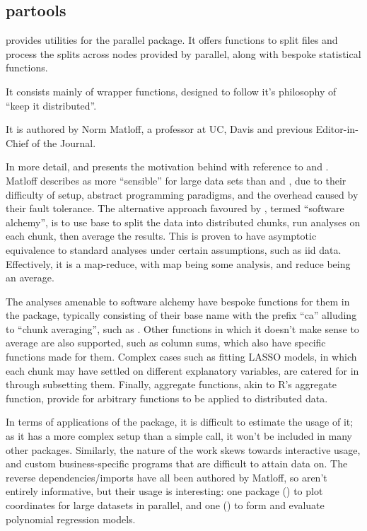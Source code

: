 \subsection{partools}\label{subsec:partools}

 provides utilities for the parallel
package\cite{matloff16softw_alchemy}. It offers functions to split
files and process the splits across nodes provided by parallel, along
with bespoke statistical functions.

It consists mainly of wrapper functions, designed to follow it's
philosophy of ``keep it distributed''.

It is authored by Norm Matloff, a professor at UC, Davis and previous
Editor-in-Chief of the \R Journal.

In more detail, \textcite{matloff15} and \textcite{matloff17} presents the
motivation behind  with reference to  and . Matloff
describes  as more ``sensible'' for large data sets than 
and , due to their difficulty of setup, abstract programming
paradigms, and the overhead caused by their fault tolerance. The
alternative approach favoured by , termed ``software alchemy'',
is to use base \R to split the data into distributed chunks, run analyses
on each chunk, then average the results. This is proven to have
asymptotic equivalence to standard analyses under certain assumptions,
such as iid data. Effectively, it is a map-reduce, with map being some
analysis, and reduce being an average.

The analyses amenable to software alchemy have bespoke functions for
them in the package, typically consisting of their base \R name with the
prefix ``ca'' alluding to ``chunk averaging'', such as
. Other functions in which it
doesn't make sense to average are also supported, such as column sums,
which also have specific functions made for them. Complex cases such as
fitting LASSO models, in which each chunk may have settled on different
explanatory variables, are catered for in  through subsetting
them. Finally, aggregate functions, akin to R's aggregate function,
provide for arbitrary functions to be applied to distributed data.

In terms of applications of the package, it is difficult to estimate the
usage of it; as it has a more complex setup than a simple
 call, it won't be included in many other packages.
Similarly, the nature of the work skews towards interactive usage, and
custom business-specific programs that are difficult to attain data on.
The reverse dependencies/imports have all been authored by Matloff, so
aren't entirely informative, but their usage is interesting: one package
() to plot coordinates for large datasets in parallel, and one
() to form and evaluate polynomial regression models.

